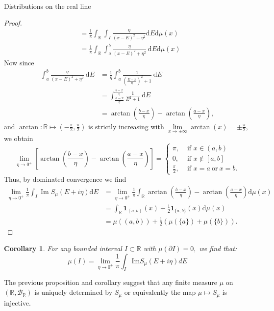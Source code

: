 \documentclass[11pt, a4paper, oneside]{book}
\numberwithin{equation}{chapter}
\newtheorem{cor}[thm]{Corollary}
\begin{document}
\begin{section}{Distributions on the real line}
\begin{proof}
\[\begin{aligned}
&=\frac{1}{\pi} \int_{\mathbb{R}} \int_I \frac{\eta}{(x-E)^2+\eta^2} \mathrm{d} E \mathrm{d}\mu (x) \\
&=\frac{1}{\pi} \int_{\mathbb{R}} \int_a^b \frac{\eta}{(x-E)^2+\eta^2} \mathrm{~d} E \mathrm{d} \mu (x)
\end{aligned}
\]
Now since
\[
\begin{aligned}
\int_a^b \frac{\eta}{(x-E)^2+\eta^2} \mathrm{~d} E &=\frac{1}{\eta} \int_a^b \frac{1}{\left(\frac{E-x}{\eta}\right)^2+1} \mathrm{~d} E \\
&=\int_{\frac{a-x}{\eta}}^{\frac{b-x}{\eta}} \frac{1}{E^2+1} \mathrm{~d} E \\
&=\arctan \left(\frac{b-x}{\eta}\right)-\arctan \left(\frac{a-x}{\eta}\right),
\end{aligned}
\]
and $\arctan : \mathbb{R} \mapsto \left(-\frac{\pi}{2},\frac{\pi}{2}\right)$ is strictly increasing with $\lim \limits_{x \rightarrow \pm \infty} \arctan (x)=\pm \frac{\pi}{2}$, we obtain
\[
\lim _{\eta \to 0^+}\left[\arctan \left(\frac{b-x}{\eta}\right)-\arctan \left(\frac{a-x}{\eta}\right)\right]= \begin{cases}\pi , & \text { if } x \in(a, b) \\ 0, & \text { if } x \notin[a, b] \\ \frac{\pi}{2}, & \text { if } x=a \ \text{or} \ x=b .\end{cases}
\]
Thus, by dominated convergence we find
\[
\begin{aligned}
\lim _{\eta \to 0^+} \frac{1}{\pi} \int_I \operatorname{Im} S_\mu(E+i \eta) \mathrm{d} E &=\lim _{\eta \to 0^+} \frac{1}{\pi} \int_{\mathbb{R}} \arctan \left(\frac{b-x}{\eta}\right)-\arctan \left(\frac{a-x}{\eta}\right) \mathrm{d} \mu (x) \\
&=\int_{\mathbb{R}} \mathbf{1}_{(a, b)}(x)+\frac{1}{2} \mathbf{1}_{\{a, b\}}(x) \mathrm{d} \mu (x) \\
&=\mu((a, b))+\frac{1}{2}(\mu(\{a\})+\mu(\{b\})).
\end{aligned}
\]
\end{proof}
%
\begin{cor} \label{re-cor} For any bounded interval $I \subset \mathbb{R}$ with $\mu(\partial I)=0,$ we find that:
\[
\mu(I) = \lim \limits_{\eta \to 0^+} \frac{1}{\pi} \int_I  \mathrm{Im} S_\mu (E+i\eta) dE
\]
\end{cor}
%
The previous proposition and corollary suggest that any finite measure $\mu$ on $(\mathbb{R},\mathcal{B}_{\mathbb{R}})$ is uniquely determined by $S_\mu$ or equivalently the map $\mu \mapsto S_\mu$ is injective.
\end{section}
\end{document}
